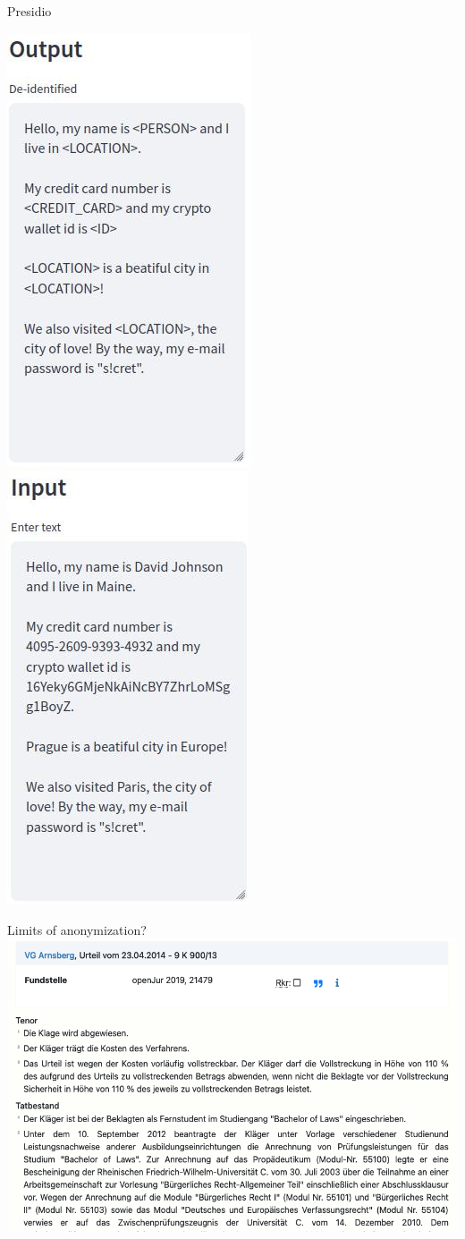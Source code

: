 \documentclass[12pt,aspectratio=169,handout]{beamer}
\begin{document}
\begin{frame}{Presidio}

\includegraphics[width=0.35\linewidth]{img/presidio-out}
\pause
\includegraphics[width=0.35\linewidth]{img/presidio-in}

\end{frame}



\begin{frame}{Limits of anonymization?}
\includegraphics[width=0.95\linewidth]{img/hagen2}
\end{frame}
\end{document}
